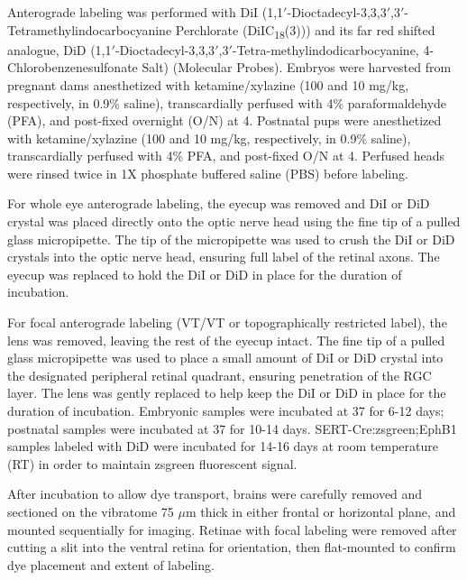Anterograde labeling was performed with DiI (1,1$'$-Dioctadecyl-3,3,3$'$,3$'$-Tetramethylindocarbocyanine Perchlorate (DiIC\textsubscript{18}(3))) and its far red shifted analogue, DiD (1,1$'$-Dioctadecyl-3,3,3$'$,3$'$-Tetra-methylindodicarbocyanine, 4-Chlorobenzenesulfonate Salt) (Molecular Probes).
Embryos were harvested from pregnant dams anesthetized with ketamine/xylazine (100 and 10 mg/kg, respectively, in 0.9\% saline), transcardially perfused with 4\% paraformaldehyde (PFA), and post-fixed overnight (O/N) at 4\textcelsius.
Postnatal pups were anesthetized with ketamine/xylazine (100 and 10 mg/kg, respectively, in 0.9\% saline), transcardially perfused with 4\% PFA, and post-fixed O/N at 4\textcelsius.
Perfused heads were rinsed twice in 1X phosphate buffered saline (PBS) before labeling.

For whole eye anterograde labeling, the eyecup was removed and DiI or DiD crystal was placed directly onto the optic nerve head using the fine tip of a pulled glass micropipette.
The tip of the micropipette was used to crush the DiI or DiD crystals into the optic nerve head, ensuring full label of the retinal axons.
The eyecup was replaced to hold the DiI or DiD in place for the duration of incubation.

For focal anterograde labeling (VT/VT or topographically restricted label), the lens was removed, leaving the rest of the eyecup intact.
The fine tip of a pulled glass micropipette was used to place a small amount of DiI or DiD crystal into the designated peripheral retinal quadrant, ensuring penetration of the RGC layer.
The lens was gently replaced to help keep the DiI or DiD in place for the duration of incubation.
Embryonic samples were incubated at 37\textcelsius{} for 6-12 days; postnatal samples were incubated at 37\textcelsius{} for 10-14 days.
SERT-Cre:zsgreen;EphB1 samples labeled with DiD were incubated for 14-16 days at room temperature (RT) in order to maintain zsgreen fluorescent signal.

After incubation to allow dye transport, brains were carefully removed and sectioned on the vibratome 75 $\mu$m thick in either frontal or horizontal plane, and mounted sequentially for imaging.
Retinae with focal labeling were removed after cutting a slit into the ventral retina for orientation, then flat-mounted to confirm dye placement and extent of labeling.